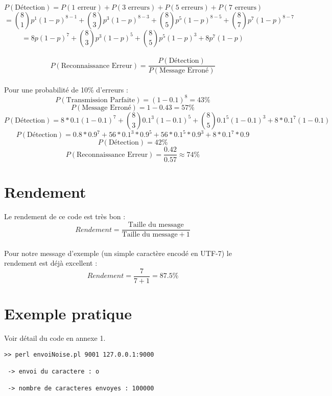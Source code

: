         \paragraph{}
\[  P(\text{Détection}) = P(\text{1 erreur}) + P(\text{3 erreurs}) + P(\text{5 erreurs}) + P(\text{7 erreurs}) \]
\[ = {8\choose 1}p^1(1-p)^{8-1} + {8\choose 3}p^3(1-p)^{8-3} + {8\choose 5}p^5(1-p)^{8-5} + {8\choose 7}p^7(1-p)^{8-7} \]
\[ = 8p(1-p)^7 + {8\choose 3}p^3(1-p)^5 + {8\choose 5}p^5(1-p)^3 + 8p^7(1-p) \]
        \paragraph{}
\[  P(\text{Reconnaissance Erreur}) = \frac{P(\text{Détection})}{P(\text{Message Erroné})}\]
        \paragraph{}
Pour une probabilité de 10\% d'erreurs :
\[  P(\text{Transmission Parfaite}) = (1-0.1)^{8} = 43\%\]
\[  P(\text{Message Erroné}) = 1 - 0.43 = 57\% \]
\[  P(\text{Détection}) = 8*0.1(1-0.1)^7 + {8\choose 3}0.1^3(1-0.1)^5 + {8\choose 5}0.1^5(1-0.1)^3 + 8*0.1^7(1-0.1) \]
\[  P(\text{Détection}) = 0.8*0.9^7 + 56*0.1^3*0.9^5 + 56*0.1^5*0.9^3 + 8*0.1^7*0.9 \]
\[  P(\text{Détection}) = 42\% \]
\[  P(\text{Reconnaissance Erreur}) = \frac{0.42}{0.57} \approx 74\% \]


    \section{Rendement}

        \paragraph{}
Le rendement de ce code est très bon :
\[  Rendement = \frac{\text{Taille du message}}{\text{Taille du message}+1} \]
        \paragraph{}
Pour notre message d'exemple (un simple caractère encodé en UTF-7) le rendement est déjà excellent :
\[  Rendement = \frac{7}{7+1} = 87.5\% \]


    \section{Exemple pratique}

        \lstset{
            language=bash, basicstyle=\ttfamily\small, columns=flexible,
            tabsize=2, extendedchars=true, showspaces=false,
            showstringspaces=false, numbers=left, numberstyle=\tiny,
            breaklines=true, breakautoindent=true, captionpos=b
        }
Voir détail du code en annexe 1.
        \begin{lstlisting}
>> perl envoiNoise.pl 9001 127.0.0.1:9000

 -> envoi du caractere : o

 -> nombre de caracteres envoyes : 100000

        \end{lstlisting}

